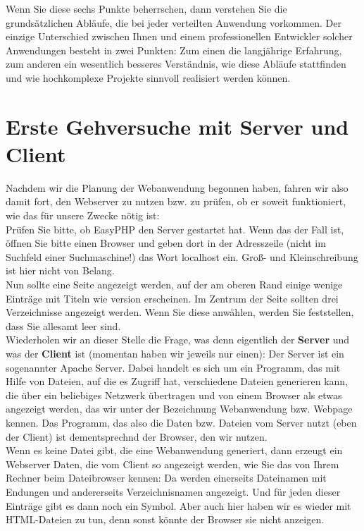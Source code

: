 Wenn Sie diese sechs Punkte beherrschen, dann verstehen Sie die\\ grundsätzlichen Abläufe, die bei jeder verteilten Anwendung vorkommen. Der einzige Unterschied zwischen Ihnen und einem professionellen Entwickler solcher Anwendungen besteht in zwei Punkten: Zum einen die langjährige Erfahrung, zum anderen ein wesentlich besseres Verständnis, wie diese Abläufe stattfinden und wie hochkomplexe Projekte sinnvoll realisiert werden können.

\section{Erste Gehversuche mit Server und Client}

Nachdem wir die Planung der Webanwendung begonnen haben, fahren wir also damit fort, den Webserver zu nutzen bzw. zu prüfen, ob er soweit funktioniert, wie das für unsere Zwecke nötig ist:\\

Prüfen Sie bitte, ob EasyPHP den Server gestartet hat. Wenn das der Fall ist, öffnen Sie bitte einen Browser und geben dort in der Adresszeile (nicht im Suchfeld einer Suchmaschine!) das Wort localhost ein. Groß- und Kleinschreibung ist hier nicht von Belang.\\

Nun sollte eine Seite angezeigt werden, auf der am oberen Rand einige wenige Einträge mit Titeln wie \glqq{}version\grqq{} erscheinen. Im Zentrum der Seite sollten drei Verzeichnisse angezeigt werden. Wenn Sie diese anwählen, werden Sie feststellen, dass Sie allesamt leer sind.\\

Wiederholen wir an dieser Stelle die Frage, was denn eigentlich der \textbf{Server} und was der \textbf{Client} ist (momentan haben wir jeweils nur einen): Der Server ist ein sogenannter Apache Server. Dabei handelt es sich um ein Programm, das mit Hilfe von Dateien, auf die es Zugriff hat, verschiedene Dateien generieren kann, die über ein beliebiges Netzwerk übertragen und von einem Browser als etwas angezeigt werden, das wir unter der Bezeichnung Webanwendung bzw. Webpage kennen. Das Programm, das also die Daten bzw. Dateien vom Server nutzt (eben der Client) ist dementsprechnd der Browser, den wir nutzen.\\

Wenn es keine Datei gibt, die eine Webanwendung generiert, dann erzeugt ein Webserver Daten, die vom Client so angezeigt werden, wie Sie das von Ihrem Rechner beim Dateibrowser kennen: Da werden einerseits Dateinamen mit Endungen und andererseits Verzeichnisnamen angezeigt. Und für jeden dieser Einträge gibt es dann noch ein Symbol. Aber auch hier haben wir es wieder mit HTML-Dateien zu tun, denn sonst könnte der Browser sie nicht anzeigen.\\

